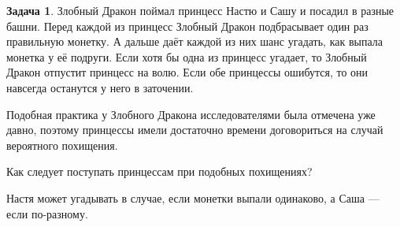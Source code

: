 \documentclass[nobib]{tufte-handout}
\theoremstyle{definition}
\newtheorem{problem}{Задача}
\begin{document}
\begin{problem}
Злобный Дракон поймал принцесс Настю и Сашу и посадил в разные башни. Перед каждой из принцесс Злобный Дракон подбрасывает один раз правильную монетку. А дальше даёт каждой из них шанс угадать, как выпала монетка у её подруги. Если хотя бы одна из принцесс угадает, то Злобный Дракон отпустит принцесс на волю. Если обе принцессы ошибутся, то они навсегда останутся у него в заточении.

Подобная практика у Злобного Дракона исследователями была отмечена уже давно, поэтому принцессы имели достаточно времени договориться на случай вероятного похищения.

Как следует поступать принцессам при подобных похищениях?

\begin{sol}
Настя может угадывать в случае, если монетки выпали одинаково, а Саша — если по-разному.
\end{sol}


\end{problem}
\end{document}
